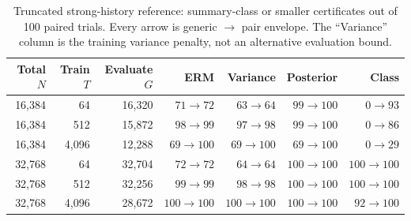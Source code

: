 \begin{table}[tb]
\centering\small
\setlength{\tabcolsep}{3.5pt}
\caption{Truncated strong-history reference: summary-class or smaller certificates out of 100 paired trials. Every arrow is generic $\to$ pair envelope. The ``Variance'' column is the training variance penalty, not an alternative evaluation bound.}\label{tab:allocation}
\begin{tabular}{@{}rrr rrrr@{}}
\toprule
Total $N$ & Train $T$ & Evaluate $G$ & ERM & Variance & Posterior & Class\\
\midrule
16,384 & 64 & 16,320 & $71\to 72$ & $63\to 64$ & $99\to 100$ & $0\to 93$\\
16,384 & 512 & 15,872 & $98\to 99$ & $97\to 98$ & $99\to 100$ & $0\to 86$\\
16,384 & 4,096 & 12,288 & $69\to 100$ & $69\to 100$ & $69\to 100$ & $0\to 29$\\
32,768 & 64 & 32,704 & $72\to 72$ & $64\to 64$ & $100\to 100$ & $100\to 100$\\
32,768 & 512 & 32,256 & $99\to 99$ & $98\to 98$ & $100\to 100$ & $100\to 100$\\
32,768 & 4,096 & 28,672 & $100\to 100$ & $100\to 100$ & $100\to 100$ & $92\to 100$\\
\bottomrule
\end{tabular}
\end{table}
